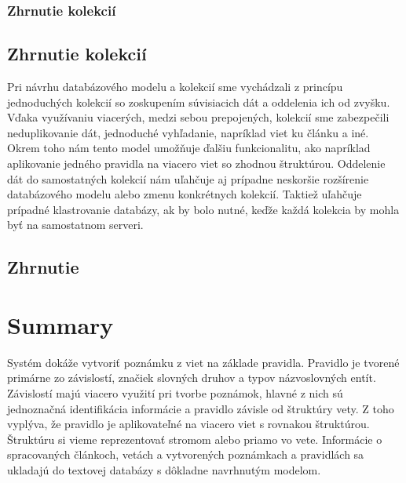 %
%
{
	\subsubsection{Zhrnutie kolekcií}
}
{
	\subsection{Zhrnutie kolekcií}
}
\label{subsubsection:collections_summary}
Pri návrhu databázového modelu a kolekcií sme vychádzali z princípu jednoduchých kolekcií so zoskupením súvisiacich dát a oddelenia ich od zvyšku. Vďaka využívaniu viacerých, medzi sebou prepojených, kolekcií sme zabezpečili neduplikovanie dát, jednoduché vyhľadanie, napríklad viet ku článku a iné. Okrem toho nám tento model umožňuje ďalšiu funkcionalitu, ako napríklad aplikovanie jedného pravidla na viacero viet so zhodnou štruktúrou. Oddelenie dát do samostatných kolekcií nám uľahčuje aj prípadne neskoršie rozšírenie databázového modelu alebo zmenu konkrétnych kolekcií. Taktiež uľahčuje prípadné klastrovanie databázy, ak by bolo nutné, keďže každá kolekcia by mohla byť na samostatnom serveri.

%
%
{
	\subsection{Zhrnutie}
}
{
	\section{Summary}
}
\label{subsection:design_summary}
Systém dokáže vytvoriť poznámku z viet na základe pravidla. Pravidlo je tvorené primárne zo závislostí, značiek slovných druhov a typov názvoslovných entít. Závislostí majú viacero využití pri tvorbe poznámok, hlavné z nich sú jednoznačná identifikácia informácie a pravidlo závisle od štruktúry vety. Z toho vyplýva, že pravidlo je aplikovateľné na viacero viet s rovnakou štruktúrou. Štruktúru si vieme reprezentovať stromom alebo priamo vo vete. Informácie o spracovaných článkoch, vetách a vytvorených poznámkach a pravidlách sa ukladajú do textovej databázy s dôkladne navrhnutým modelom.